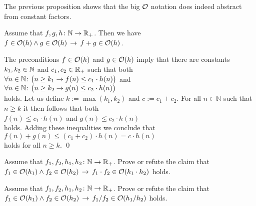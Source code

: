 \remark 
The previous proposition shows that the big $\mathcal{O}$ notation does indeed abstract
from constant factors. \eoxs

\begin{Proposition}
Assume that $f,g,h \colon {\mathbb N} \rightarrow {{\mathbb R}_+}$. Then we have 
\\[0.2cm]
\hspace*{1.3cm}
$f \in \mathcal{O}(h) \wedge g \in \mathcal{O}(h) \,\rightarrow\, f + g \in \mathcal{O}(h)$.
\end{Proposition}

\proof
The preconditions $f \in \mathcal{O}(h)$ and $g \in \mathcal{O}(h)$ imply that there are constants $k_1,k_2\in {\mathbb N}$
and $c_1,c_2\in {\mathbb R}_+$ such that both \\[0.2cm]
\hspace*{1.3cm} 
$\forall n \in {\mathbb N} \colon \bigl( n \geq k_1 \rightarrow f(n) \leq c_1 \cdot h(n)\bigr)$ 
\quad and
\\[0.2cm]
\hspace*{1.3cm} 
$\forall n \in {\mathbb N} \colon\bigl( n \geq k_2 \rightarrow g(n) \leq c_2 \cdot h(n)\bigr)$
\\[0.2cm]
holds.  Let us define $k := \max(k_1,k_2)$ and $c:= c_1 + c_2$.  For all $n \in \mathbb{N}$ such
that $n \geq k$ it then follows that both
\\[0.2cm]
\hspace*{1.3cm}
 $f(n) \leq c_1 \cdot h(n)$ \quad and \quad  $g(n) \leq c_2 \cdot h(n)$
\\[0.2cm]
holds.  Adding these inequalities we conclude that 
\\[0.2cm]
\hspace*{1.3cm} $f(n) + g(n) \leq (c_1 + c_2) \cdot h(n) = c \cdot h(n)$
\\[0.2cm]
holds for all $n \geq k$.
\qed

\exercise
Assume that $f_1,f_2,h_1,h_2 \colon {\mathbb N} \rightarrow {{\mathbb R}_+}$.  Prove or refute the claim that 
\\[0.2cm]
\hspace*{1.3cm}
$f_1 \in \mathcal{O}(h_1) \wedge f_2 \in \mathcal{O}(h_2) \,\rightarrow\, f_1 \cdot f_2 \in \mathcal{O}(h_1 \cdot h_2)$
\quad holds.  \eoxs


\exercise
Assume that $f_1,f_2,h_1,h_2 \colon {\mathbb N} \rightarrow {{\mathbb R}_+}$.  Prove or refute the claim that 
\\[0.2cm]
\hspace*{1.3cm}
$f_1 \in \mathcal{O}(h_1) \wedge f_2 \in \mathcal{O}(h_2) \,\rightarrow\, f_1 / f_2 \in \mathcal{O}(h_1 / h_2)$
\quad holds.  \eoxs

